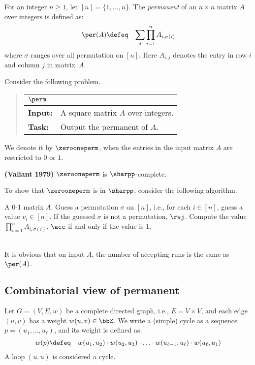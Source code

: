 \documentclass[11pt, a4paper]{article}
\begin{document}
For an integer $n\geq 1$, let $[n]=\{1,\ldots,n\}$.
The {\em permanent} of an $n\times n$ matrix $A$ over integers is defined as: 
\begin{eqnarray*}
\per(A) & \defeq & 
\sum_{\sigma} \prod_{i=1}^n A_{i,\sigma(i)}
\end{eqnarray*}
where $\sigma$ ranges over all permutation on $[n]$.
Here $A_{i,j}$ denotes the entry in row $i$ and column $j$ in matrix~$A$.

Consider the following problem.
\begin{quote}
{\def\arraystretch{1.25}
\begin{tabular}{|ll|}
\hline
\multicolumn{2}{|l|}{$\perm$}
\\
\hline
{\bf Input:}
&
A square matrix $A$ over integers.
\\
{\bf Task:}
&
Output the permanent of $A$.
\\
\hline
\end{tabular}}
\end{quote}
We denote it by $\zerooneperm$,
when the entries in the input matrix $A$ are restricted to $0$ or $1$.



\begin{theorem}
\label{theo:permanent-valiant}
{\bf (Valiant 1979)}
$\zerooneperm$ is $\sharpp$-complete.
\end{theorem}

To show that $\zerooneperm$ is in $\sharpp$,
consider the following algorithm.
\begin{algorithm}
\begin{algorithmic}[1]
\REQUIRE
A 0-1 matrix $A$.
\STATE
Guess a permutation $\sigma$ on $[n]$, i.e.,
for each $i\in [n]$, guess a value $v_i \in [n]$.
\STATE
If the guessed $\sigma$ is not a permutation, $\rej$.
\STATE
Compute the value $\prod_{i=1}^{n} A_{i,\sigma(i)}$.
\STATE
$\acc$ if and only if the value is $1$.
\end{algorithmic}
\end{algorithm}
\\
It is obvious that on input $A$,
the number of accepting runs is the same as $\per(A)$.


\subsection{Combinatorial view of permanent}


Let $G=(V,E,w)$ be a complete directed graph, i.e., $E=V\times V$,
and each edge $(u,v)$ has a weight $w(u,v)\in \bbZ$.
We write a (simple) cycle as a sequence $p=(u_1,\ldots,u_{\ell})$,
and its weight is defined as:
\begin{eqnarray*}
w(p) & \defeq & w(u_1,u_{2})\cdot w(u_2,u_3)\cdot \ldots \cdot w(u_{\ell-1},u_{\ell})\cdot w(u_{\ell},u_1)
\end{eqnarray*}
A loop $(u,u)$ is considered a cycle.
\end{document}
